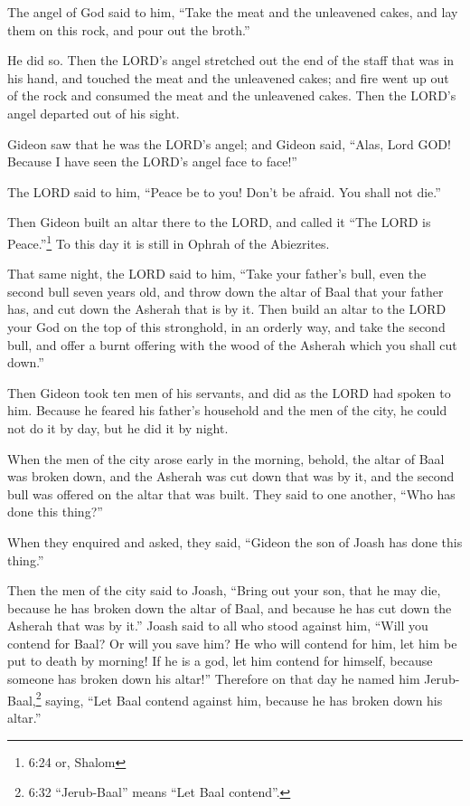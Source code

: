  The angel of God said to him, ``Take the meat and the
unleavened cakes, and lay them on this rock, and pour out the broth.''

He did so.  Then the LORD's angel stretched out the end of
the staff that was in his hand, and touched the meat and the unleavened
cakes; and fire went up out of the rock and consumed the meat and the
unleavened cakes. Then the LORD's angel departed out of his sight.

 Gideon saw that he was the LORD's angel; and Gideon said,
``Alas, Lord GOD! Because I have seen the LORD's angel face to face!''

 The LORD said to him, ``Peace be to you! Don't be afraid.
You shall not die.''

 Then Gideon built an altar there to the LORD, and called
it ``The LORD is Peace.''\footnote{6:24 or, Shalom} To this day it is
still in Ophrah of the Abiezrites.

 That same night, the LORD said to him, ``Take your
father's bull, even the second bull seven years old, and throw down the
altar of Baal that your father has, and cut down the Asherah that is by
it.  Then build an altar to the LORD your God on the top of
this stronghold, in an orderly way, and take the second bull, and offer
a burnt offering with the wood of the Asherah which you shall cut
down.''

 Then Gideon took ten men of his servants, and did as the
LORD had spoken to him. Because he feared his father's household and the
men of the city, he could not do it by day, but he did it by night.

 When the men of the city arose early in the morning,
behold, the altar of Baal was broken down, and the Asherah was cut down
that was by it, and the second bull was offered on the altar that was
built.  They said to one another, ``Who has done this
thing?''

When they enquired and asked, they said, ``Gideon the son of Joash has
done this thing.''

 Then the men of the city said to Joash, ``Bring out your
son, that he may die, because he has broken down the altar of Baal, and
because he has cut down the Asherah that was by it.'' 
Joash said to all who stood against him, ``Will you contend for Baal? Or
will you save him? He who will contend for him, let him be put to death
by morning! If he is a god, let him contend for himself, because someone
has broken down his altar!''  Therefore on that day he
named him Jerub-Baal,\footnote{6:32 ``Jerub-Baal'' means ``Let Baal
  contend''.} saying, ``Let Baal contend against him, because he has
broken down his altar.''

